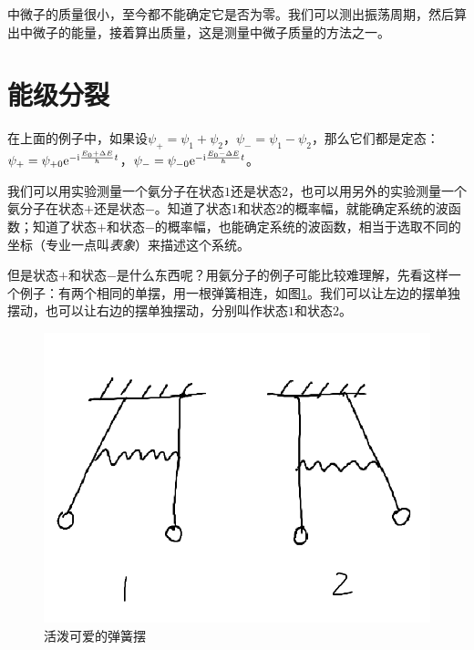 中微子的质量很小，至今都不能确定它是否为零。我们可以测出振荡周期，然后算出中微子的能量，接着算出质量，这是测量中微子质量的方法之一。
\section{能级分裂}
在上面的例子中，如果设$\psi_+=\psi_1+\psi_2$，$\psi_-=\psi_1-\psi_2$，那么它们都是定态：$\psi_+=\psi_{+ 0} \mathrm{e}^{-\mathrm{i} \frac{E_0+\Delta E}{\hbar} t}$，$\psi_-=\psi_{- 0} \mathrm{e}^{-\mathrm{i} \frac{E_0-\Delta E}{\hbar} t}$。

我们可以用实验测量一个氨分子在状态$1$还是状态$2$，也可以用另外的实验测量一个氨分子在状态$+$还是状态$-$。知道了状态$1$和状态$2$的概率幅，就能确定系统的波函数；知道了状态$+$和状态$-$的概率幅，也能确定系统的波函数，相当于选取不同的坐标（专业一点叫\emph{表象}）来描述这个系统。

但是状态$+$和状态$-$是什么东西呢？用氨分子的例子可能比较难理解，先看这样一个例子：有两个相同的单摆，用一根弹簧相连，如图\ref{fig-spring-pend}。我们可以让左边的摆单独摆动，也可以让右边的摆单独摆动，分别叫作状态$1$和状态$2$。
\begin{figure}[htb]
\centering
\includegraphics[scale=0.5]{fig/spring-pend}
\caption{活泼可爱的弹簧摆}
\label{fig-spring-pend}
\end{figure}

